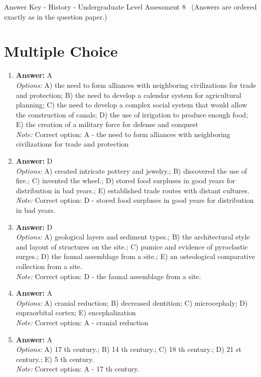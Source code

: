 \documentclass[12pt]{article}
\begin{document}
\begin{center}
Answer Key - History - Undergraduate Level Assessment 8 \
\small (Answers are ordered exactly as in the question paper.)
\end{center}

\section*{Multiple Choice}
\begin{enumerate}[label=\arabic*.]
\item \textbf{Answer:} A
\\ \textit{Options:} A) the need to form alliances with neighboring civilizations for trade and protection; B) the need to develop a calendar system for agricultural planning; C) the need to develop a complex social system that would allow the construction of canals; D) the use of irrigation to produce enough food; E) the creation of a military force for defense and conquest
\\ \textit{Note:} Correct option: A - the need to form alliances with neighboring civilizations for trade and protection
\item \textbf{Answer:} D
\\ \textit{Options:} A) created intricate pottery and jewelry.; B) discovered the use of fire.; C) invented the wheel.; D) stored food surpluses in good years for distribution in bad years.; E) established trade routes with distant cultures.
\\ \textit{Note:} Correct option: D - stored food surpluses in good years for distribution in bad years.
\item \textbf{Answer:} D
\\ \textit{Options:} A) geological layers and sediment types.; B) the architectural style and layout of structures on the site.; C) pumice and evidence of pyroclastic surges.; D) the faunal assemblage from a site.; E) an osteological comparative collection from a site.
\\ \textit{Note:} Correct option: D - the faunal assemblage from a site.
\item \textbf{Answer:} A
\\ \textit{Options:} A) cranial reduction; B) decreased dentition; C) microcephaly; D) supraorbital cortex; E) encephalization
\\ \textit{Note:} Correct option: A - cranial reduction
\item \textbf{Answer:} A
\\ \textit{Options:} A) 17 th century.; B) 14 th century.; C) 18 th century.; D) 21 st century.; E) 5 th century.
\\ \textit{Note:} Correct option: A - 17 th century.
\end{enumerate}
\end{document}
